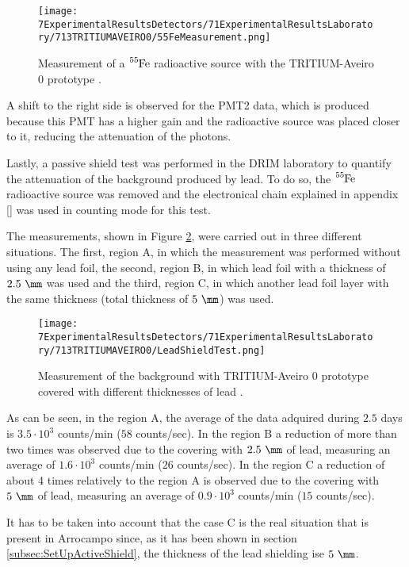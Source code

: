 \begin{figure}[htbp]
\centering
\texttt{[image: 7ExperimentalResultsDetectors/71ExperimentalResultsLaboratory/713TRITIUMAVEIRO0/55FeMeasurement.png]}
\caption{Measurement of a $\ce{^{55}Fe}$ radioactive source with the TRITIUM-Aveiro 0 prototype \cite{ExperimentalPaperCarlos}.\label{fig:55FeMeasurement}}
\end{figure}

A shift to the right side is observed for the PMT2 data, which is produced because this PMT has a higher gain and the radioactive source was placed closer to it, reducing the attenuation of the photons.

Lastly, a passive shield test was performed in the DRIM laboratory to quantify the attenuation of the background produced by lead. To do so, the $\ce{^{55}Fe}$ radioactive source was removed and the electronical chain explained in appendix \ref{} was used in counting mode for this test.

The measurements, shown in Figure \ref{fig:LeadShieldTest}, were carried out in three different situations. The first, region A, in which the measurement was performed without using any lead foil, the second, region B, in which lead foil with a thickness of $2.5~\mm$ was used and the third, region C, in which another lead foil layer with the same thickness (total thickness of $5~\mm$) was used.

\begin{figure}[htbp]
\centering
\texttt{[image: 7ExperimentalResultsDetectors/71ExperimentalResultsLaboratory/713TRITIUMAVEIRO0/LeadShieldTest.png]}
\caption{Measurement of the background with TRITIUM-Aveiro 0 prototype covered with different thicknesses of lead \cite{ExperimentalPaperCarlos}.\label{fig:LeadShieldTest}}
\end{figure}

As can be seen, in the region A, the average of the data adquired during $2.5$ days is $3.5 \cdot{} 10^3$ counts/min ($58$ counts/sec). In the region B a reduction of more than two times was observed due to the covering with $2.5~\mm$ of lead, measuring an average of $1.6 \cdot{} 10^3$ counts/min ($26$ counts/sec). In the region C a reduction of about 4 times relatively to the region A is observed due to the covering with $5~\mm$ of lead, measuring an average of $0.9 \cdot{} 10^3$ counts/min ($15$ counts/sec).

It has to be taken into account that the case C is the real situation that is present in Arrocampo since, as it has been shown in section \ref{subsec:SetUpActiveShield}, the thickness of the lead shielding ise $5~\mm$.

